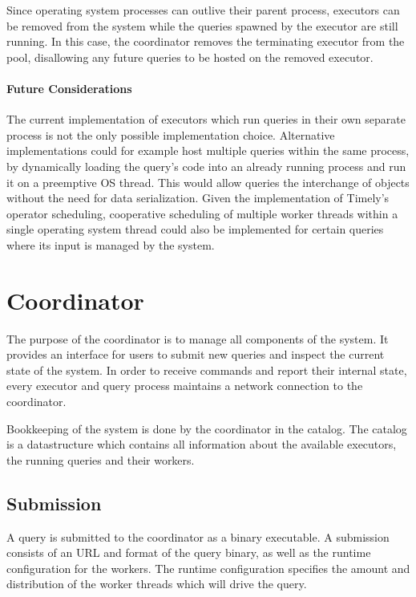 Since operating system processes can outlive their parent process, executors can
be removed from the system while the queries spawned by the executor are still
running. In this case, the coordinator removes the terminating executor from
the pool, disallowing any future queries to be hosted on the removed executor.

\paragraph{Future Considerations}

The current implementation of executors which run queries in their own separate
process is not the only possible implementation choice.
Alternative implementations could for example host multiple queries
within the same process, by dynamically loading the query's code into an already
running process and run it on a preemptive OS thread. This would allow queries
the interchange of objects without the need for data serialization. Given
the implementation of Timely's operator scheduling, cooperative scheduling
of multiple worker threads within a single operating system thread could also
be implemented for certain queries where its input is managed by the system.
\section{Coordinator}

The purpose of the coordinator is to manage all components of the system. It
provides an interface for users to submit new queries and inspect the current
state of the system. In order to receive commands and report their internal state,
every executor and query process maintains a network connection to the coordinator.

Bookkeeping of the system is done by the coordinator in the catalog. The
catalog is a datastructure which contains all information about the available
executors, the running queries and their workers. 

\subsection{Submission}

A query is submitted to the coordinator as a binary executable. A submission
consists of an URL and format of the query binary, as well as the runtime
configuration for the workers. The runtime configuration specifies the amount
and distribution of the worker threads which will drive the query.

